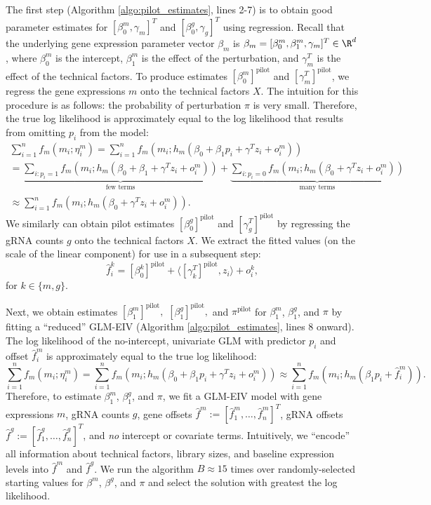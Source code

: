 \documentclass[12pt]{article}
\begin{document}
The first step (Algorithm \ref{algo:pilot_estimates}, lines 2-7) is to obtain good parameter estimates for $[\beta^m_0, \gamma_m]^T$ and $[\beta^g_0, \gamma_g]^T$ using regression. Recall that the underlying gene expression parameter vector $\beta_m$ is $\beta_m = [\beta^m_0, \beta^m_1, \gamma_m]^T \in \R^d$, where $\beta^m_0$ is the intercept, $\beta^m_1$ is the effect of the perturbation, and $\gamma_m^T$ is the effect of the technical factors. To produce estimates $[\beta^m_0]^\textrm{pilot}$ and $[\gamma_m^T]^\textrm{pilot}$, we regress the gene expressions $m$ onto the technical factors $X$. The intuition for this procedure is as follows: the probability of perturbation $\pi$ is very small. Therefore, the true log likelihood is approximately equal to the log likelihood that results from omitting $p_i$ from the model:
\begin{multline*}
\sum_{i=1}^n f_m(m_i; \eta^m_i) = \sum_{i=1}^n f_m(m_i; h_m(\beta_0 + \beta_1 p_i + \gamma^T z_i + o^m_i)) \\ = \underbrace{\sum_{i : p_i =1} f_m(m_i; h_m(\beta_0 + \beta_1 + \gamma^T z_i + o^m_i))}_\textrm{few terms}  + \underbrace{\sum_{i : p_i = 0} f_m(m_i; h_m(\beta_0 + \gamma^T z_i + o^m_i))}_\textrm{many terms} \\ \approx \sum_{i = 1}^n f_m(m_i; h_m(\beta_0 + \gamma^T z_i + o^m_i)).
\end{multline*}
We similarly can obtain pilot estimates $[\beta^g_0]^\textrm{pilot}$ and $[\gamma^T_g]^\textrm{pilot}$ by regressing the gRNA counts $g$ onto the technical factors $X$. We extract the fitted values (on the scale of the linear component) for use in a subsequent step: $$\hat{f}^k_i = [\beta^k_0]^\textrm{pilot} + \langle [\gamma^T_k]^\textrm{pilot}, z_i \rangle + o^k_i,$$
for $k \in \{m,g\}.$

Next, we obtain estimates $[\beta_1^m]^\textrm{pilot},$ $[\beta_1^g]^\textrm{pilot},$ and $\pi^\textrm{pilot}$ for $\beta^m_1$, $\beta^g_1$, and $\pi$ by fitting a ``reduced'' GLM-EIV (Algorithm \ref{algo:pilot_estimates}, lines 8 onward). The log likelihood of the no-intercept, univariate GLM with predictor $p_i$ and offset $\hat{f}^m_i$ is approximately equal to the true log likelihood:
$$ \sum_{i=1}^n f_m(m_i; \eta^m_i) =
\sum_{i=1}^n f_m(m_i; h_m(\beta_0 + \beta_1 p_i + \gamma^T z_i + o^m_i)) \approx \sum_{i=1}^n f_m(m_i; h_m( \beta_1 p_i + \hat{f}^m_i)).
$$
Therefore, to estimate $\beta^m_1$, $\beta^g_1$, and $\pi$, we fit a GLM-EIV model with gene expressions $m$, gRNA counts $g$, gene offsets $\hat{f}^m := [\hat{f}^m_1, \dots, \hat{f}^m_n]^T$, gRNA offsets $\hat{f}^g := [\hat{f}^g_1, \dots, \hat{f}^g_n]^T$, and \textit{no} intercept or covariate terms. Intuitively, we ``encode'' all information about technical factors, library sizes, and baseline expression levels into $\hat{f}^m$ and $\hat{f}^g$. We run the algorithm $B \approx 15$ times over randomly-selected starting values for $\beta^m$, $\beta^g$, and $\pi$ and select the solution with greatest the log likelihood.
\end{document}
